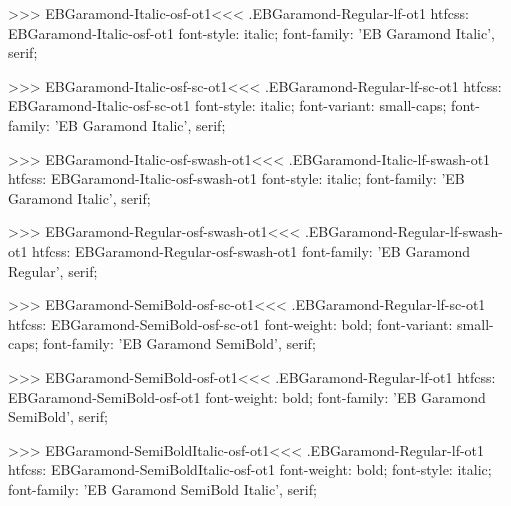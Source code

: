 {{{{{{{>>>
\<EBGaramond-Italic-osf-ot1\><<<
.EBGaramond-Regular-lf-ot1
htfcss:  EBGaramond-Italic-osf-ot1  font-style: italic; font-family: 'EB Garamond Italic', serif;

>>>
\<EBGaramond-Italic-osf-sc-ot1\><<<
.EBGaramond-Regular-lf-sc-ot1
htfcss:  EBGaramond-Italic-osf-sc-ot1  font-style: italic; font-variant: small-caps; font-family: 'EB Garamond Italic', serif;

>>>
\<EBGaramond-Italic-osf-swash-ot1\><<<
.EBGaramond-Italic-lf-swash-ot1
htfcss:  EBGaramond-Italic-osf-swash-ot1  font-style: italic; font-family: 'EB Garamond Italic', serif;

>>>
\<EBGaramond-Regular-osf-swash-ot1\><<<
.EBGaramond-Regular-lf-swash-ot1
htfcss:  EBGaramond-Regular-osf-swash-ot1  font-family: 'EB Garamond Regular', serif;

>>>
\<EBGaramond-SemiBold-osf-sc-ot1\><<<
.EBGaramond-Regular-lf-sc-ot1
htfcss:  EBGaramond-SemiBold-osf-sc-ot1  font-weight: bold; font-variant: small-caps; font-family: 'EB Garamond SemiBold', serif;

>>>
\<EBGaramond-SemiBold-osf-ot1\><<<
.EBGaramond-Regular-lf-ot1
htfcss:  EBGaramond-SemiBold-osf-ot1  font-weight: bold; font-family: 'EB Garamond SemiBold', serif;

>>>
\<EBGaramond-SemiBoldItalic-osf-ot1\><<<
.EBGaramond-Regular-lf-ot1
htfcss:  EBGaramond-SemiBoldItalic-osf-ot1  font-weight: bold; font-style: italic; font-family: 'EB Garamond SemiBold Italic', serif;

}}}}}}}
